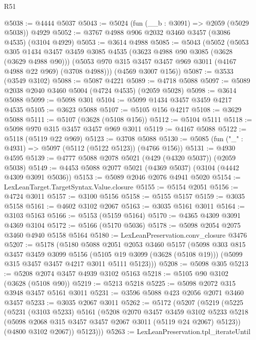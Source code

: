 \begin{lexlean}{R51}
\begin{coremodule}
@5038 := @4444 @5037
@5043 := @5024 (fun (__b : @3091) => @2059 (@5029 @5038)) @4929
@5052 := @3767 @4988 @906 @2032 @3460 @3457 (@3086 @4535) (@3104 @4929)
@5053 := @3614 @4988
@5085 := @5043
    (@5052
      (@5053
        @305
        @1434
        @3457
        @3459
        @3085
        @4535
        (@3623 @4988 @90 @3085 (@3628 (@3629 @4988 @90)))
        (@5053 @970 @315 @3457 @3457 @969 @3011 (@4167 @4988 @22 @969) (@3708 @4988)))
      (@4569 @3007 @156))
@5087 := @3533 (@3549 @3102)
@5088 := @5087 @4221
@5089 := @4718 @5088
@5097 := @5089 @2038 @2040 @3460 @5004 (@4724 @4535) (@2059 @5028)
@5098 := @3614 @5088
@5099 := @5098 @301
@5104 := @5099 @1434 @3457 @3459 @4217 @4535
@5105 := @3623 @5088
@5107 := @5105 @156 @4217
@5108 := @3629 @5088
@5111 := @5107 (@3628 (@5108 @156))
@5112 := @5104 @5111
@5118 := @5098 @970 @315 @3457 @3457 @969 @3011
@5119 := @4167 @5088
@5122 := @5118 (@5119 @22 @969)
@5123 := @3708 @5088
@5130 := @5085 (fun ("_" : @4931) => @5097 (@5112 (@5122 @5123)) (@4766 @156))
@5131 := @4930 @4595
@5139 := @4777 @5088 @2078 @5021 (@429 (@4320 @5037)) (@2059 @5038)
@5149 := @4453 @5088 @2077 @5021 (@4369 @5037) (@3104 (@4442 @4309 @3091 @5036))
@5153 := @5089 @2046 @2076 @4941 @5020
@5154 := LexLeanTarget.TargetSyntax.Value.closure
@5155 := @5154 @2051
@5156 := @4724 @3011
@5157 := @3100 @5156
@5158 := @5155 @5157
@5159 := @3035 @5158
@5161 := @4602 @3102 @2067
@5163 := @3035 @5161 @3011
@5164 := @3103 @5163
@5166 := @5153 (@5159 @5164)
@5170 := @4365 @4309 @3091 @4369 @3104
@5172 := @5166 (@5170 @5036)
@5178 := @5098 @2054 @2075 @3460 @4940 @5158 @5164
@5180 := LexLeanPreservation.conv_closure @3476
@5207 := @5178
    (@5180
      @5088
      @2051
      @2053
      @3460
      @5157
      (@5098
        @303
        @815
        @3457
        @3459
        @3099
        @5156
        (@5105 @19 @3099 (@3628 (@5108 @19)))
        (@5099 @315 @3457 @3457 @4217 @3011 @5111 @5123)))
@5208 := @5098 @305
@5213 := @5208 @2074 @3457 @4939 @3102 @5163
@5218 := @5105 @90 @3102 (@3628 (@5108 @90))
@5219 := @5213 @5218
@5225 := @5098 @2072 @315 @3948 @3457 @5161 @3011
@5231 := @3596 @5088 @423 @2056 @2071 @3460 @3457
@5233 := @3035 @2067 @3011
@5262 := @5172
    (@5207
      (@5219
        (@5225
          (@5231
            (@3103 @5233)
            @5161
            (@5208
              @2070
              @3457
              @3459
              @3102
              @5233
              @5218
              (@5098 @2068 @315 @3457 @3457 @2067 @3011 (@5119 @24 @2067) @5123))
            (@4800 @3102 @2067))
          @5123)))
@5263 := LexLeanPreservation.tpl_iterateUntil

\end{coremodule}
\end{lexlean}
